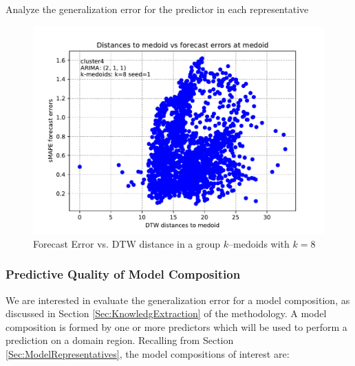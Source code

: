 
Analyze the generalization error for the predictor in each representative 

\begin{figure}[h]
	\centering
	\includegraphics[scale=0.5]{../Figures/auto_arima_distance_error_whole_brazil_1y_1ppd_k8_seed1_cluster4_pdq2-1-1_sMAPE}
	\caption{Forecast Error vs. DTW distance in a group $k$--medoids with $k=8$}
	\label{Fig:DTWvsForecastError}
\end{figure}

\subsubsection{Predictive Quality of Model Composition}
\label{Sec:ModelComposition}

We are interested in evaluate the generalization error for a model composition, as discussed in Section \ref{Sec:KnowledgExtraction} of the methodology. A model composition is formed by one or more predictors which will be used to perform a prediction on a domain region. Recalling from Section \ref{Sec:ModelRepresentatives}, the model compositions of interest are:


